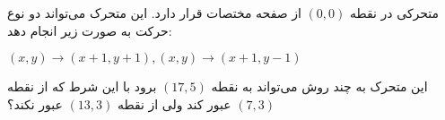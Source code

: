 \p
متحرکی در نقطه
$(0, 0)$ 
 از صفحه مختصات قرار دارد. این متحرک می‌تواند دو نوع حرکت به صورت زیر انجام دهد:
	\p
    \centerline{$(x,y) \to (x+1, y+1), (x,y) \to (x+1, y-1)$}
	\p
    این  متحرک به چند روش می‌تواند به نقطه 
$(17, 5)$ 
    برود با این شرط که از نقطه
$(7, 3)$ 
    عبور کند ولی از نقطه
$(13, 3)$ 
     عبور نکند؟
